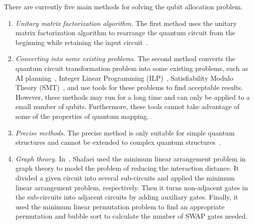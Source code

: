 \documentclass[runningheads]{llncs}
\begin{document}
There are currently five main methods for solving the qubit allocation problem.
\begin{enumerate}
	\item \emph{Unitary matrix factorization algorithm.} The first method uses the unitary matrix factorization algorithm to rearrange the quantum circuit from the beginning while retaining the input circuit~\cite{2019CNOT,2019Quantum}.
	\item \emph{Converting into some existing problems.} The second method converts the quantum circuit transformation problem into some existing problems, such as AI planning~\cite{2017Temporal,2018Integer}, Integer Linear Programming (ILP)~\cite{2019Almeida}, Satisfiability Modulo Theory (SMT)~\cite{2019Murali}, and use tools for these problems to find acceptable results. However, these methods may run for a long time and can only be applied to a small number of qubits. Furthermore, these tools cannot take advantage of some of the properties of quantum mapping.
	\item \emph{Precise methods.} 
	The precise method is only suitable for simple quantum structures and cannot be extended to complex quantum structures~\cite{2018QubitSiraichi}.
	\item \emph{Graph theory.} 
	In~\cite{Shafaei2013}, Shafaei used the minimum linear arrangement problem in graph theory to model the problem of reducing the interaction distance. It divided a given circuit into several sub-circuits and applied the minimum linear arrangement problem, respectively. Then it turns non-adjacent gates in the sub-circuits into adjacent circuits by adding auxiliary gates. Finally, it used the minimum linear permutation problem to find an appropriate permutation and bubble sort to calculate the number of SWAP gates needed.
   

\end{enumerate}
\end{document}
